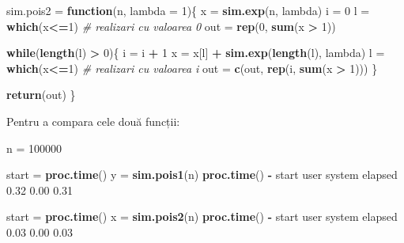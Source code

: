 \documentclass[]{article}
\newenvironment{Shaded}{\begin{snugshade}}{\end{snugshade}}
\newcommand{\KeywordTok}[1]{\textcolor[rgb]{0.13,0.29,0.53}{\textbf{#1}}}
\newcommand{\DataTypeTok}[1]{\textcolor[rgb]{0.13,0.29,0.53}{#1}}
\newcommand{\DecValTok}[1]{\textcolor[rgb]{0.00,0.00,0.81}{#1}}
\newcommand{\FloatTok}[1]{\textcolor[rgb]{0.00,0.00,0.81}{#1}}
\newcommand{\StringTok}[1]{\textcolor[rgb]{0.31,0.60,0.02}{#1}}
\newcommand{\CommentTok}[1]{\textcolor[rgb]{0.56,0.35,0.01}{\textit{#1}}}
\newcommand{\ControlFlowTok}[1]{\textcolor[rgb]{0.13,0.29,0.53}{\textbf{#1}}}
\newcommand{\OperatorTok}[1]{\textcolor[rgb]{0.81,0.36,0.00}{\textbf{#1}}}
\newcommand{\NormalTok}[1]{#1}
\begin{document}
\begin{Shaded}
\begin{Highlighting}[]
\NormalTok{sim.pois2 =}\StringTok{ }\ControlFlowTok{function}\NormalTok{(n, }\DataTypeTok{lambda =} \DecValTok{1}\NormalTok{)\{}
\NormalTok{  x =}\StringTok{ }\KeywordTok{sim.exp}\NormalTok{(n, lambda)}
\NormalTok{  i =}\StringTok{ }\DecValTok{0}
\NormalTok{  l =}\StringTok{ }\KeywordTok{which}\NormalTok{(x}\OperatorTok{<=}\DecValTok{1}\NormalTok{)}
  \CommentTok{# realizari cu valoarea 0}
\NormalTok{  out =}\StringTok{ }\KeywordTok{rep}\NormalTok{(}\DecValTok{0}\NormalTok{, }\KeywordTok{sum}\NormalTok{(x }\OperatorTok{>}\StringTok{ }\DecValTok{1}\NormalTok{)) }
  
  \ControlFlowTok{while}\NormalTok{(}\KeywordTok{length}\NormalTok{(l) }\OperatorTok{>}\StringTok{ }\DecValTok{0}\NormalTok{)\{}
\NormalTok{    i =}\StringTok{ }\NormalTok{i }\OperatorTok{+}\StringTok{ }\DecValTok{1}
\NormalTok{    x =}\StringTok{ }\NormalTok{x[l] }\OperatorTok{+}\StringTok{ }\KeywordTok{sim.exp}\NormalTok{(}\KeywordTok{length}\NormalTok{(l), lambda)}
\NormalTok{    l =}\StringTok{ }\KeywordTok{which}\NormalTok{(x}\OperatorTok{<=}\DecValTok{1}\NormalTok{)}
    \CommentTok{# realizari cu valoarea i}
\NormalTok{    out =}\StringTok{ }\KeywordTok{c}\NormalTok{(out, }\KeywordTok{rep}\NormalTok{(i, }\KeywordTok{sum}\NormalTok{(x }\OperatorTok{>}\StringTok{ }\DecValTok{1}\NormalTok{))) }
\NormalTok{  \}}
  
  \KeywordTok{return}\NormalTok{(out)}
\NormalTok{\}}
\end{Highlighting}
\end{Shaded}

Pentru a compara cele două funcții:

\begin{Shaded}
\begin{Highlighting}[]
\NormalTok{n =}\StringTok{ }\DecValTok{100000}

\NormalTok{start =}\StringTok{ }\KeywordTok{proc.time}\NormalTok{()}
\NormalTok{y =}\StringTok{ }\KeywordTok{sim.pois1}\NormalTok{(n)}
\KeywordTok{proc.time}\NormalTok{() }\OperatorTok{-}\StringTok{ }\NormalTok{start}
\NormalTok{   user  system elapsed }
   \FloatTok{0.32}    \FloatTok{0.00}    \FloatTok{0.31} 

\NormalTok{start =}\StringTok{ }\KeywordTok{proc.time}\NormalTok{()}
\NormalTok{x =}\StringTok{ }\KeywordTok{sim.pois2}\NormalTok{(n)}
\KeywordTok{proc.time}\NormalTok{() }\OperatorTok{-}\StringTok{ }\NormalTok{start}
\NormalTok{   user  system elapsed }
   \FloatTok{0.03}    \FloatTok{0.00}    \FloatTok{0.03} 
\end{Highlighting}
\end{Shaded}
\end{document}
